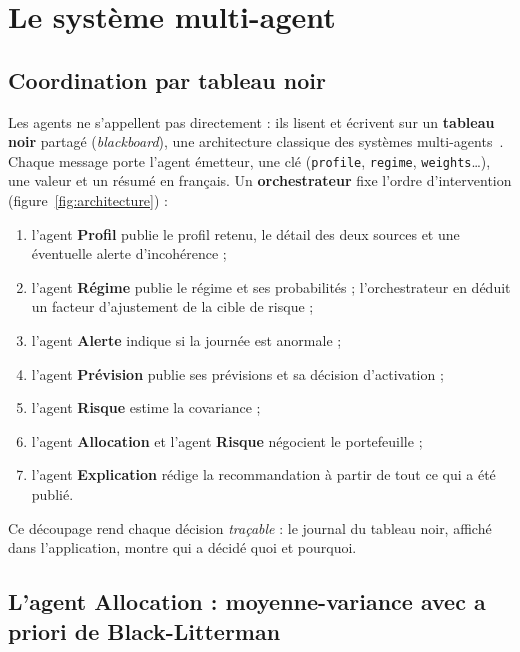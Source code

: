 \section{Le système multi-agent}
\label{sec:systeme}

\subsection{Coordination par tableau noir}

Les agents ne s'appellent pas directement : ils lisent et écrivent sur un \textbf{tableau noir} partagé (\emph{blackboard}), une architecture classique des systèmes multi-agents~\cite{wooldridge2009}. Chaque message porte l'agent émetteur, une clé (\texttt{profile}, \texttt{regime}, \texttt{weights}\dots), une valeur et un résumé en français. Un \textbf{orchestrateur} fixe l'ordre d'intervention (figure~\ref{fig:architecture}) :
\begin{enumerate}
  \item l'agent \textbf{Profil} publie le profil retenu, le détail des deux sources et une éventuelle alerte d'incohérence ;
  \item l'agent \textbf{Régime} publie le régime et ses probabilités ; l'orchestrateur en déduit un facteur d'ajustement de la cible de risque ;
  \item l'agent \textbf{Alerte} indique si la journée est anormale ;
  \item l'agent \textbf{Prévision} publie ses prévisions et sa décision d'activation ;
  \item l'agent \textbf{Risque} estime la covariance ;
  \item l'agent \textbf{Allocation} et l'agent \textbf{Risque} négocient le portefeuille ;
  \item l'agent \textbf{Explication} rédige la recommandation à partir de tout ce qui a été publié.
\end{enumerate}
Ce découpage rend chaque décision \emph{traçable} : le journal du tableau noir, affiché dans l'application, montre qui a décidé quoi et pourquoi.

\subsection{L'agent Allocation : moyenne-variance avec a priori de Black-Litterman}

